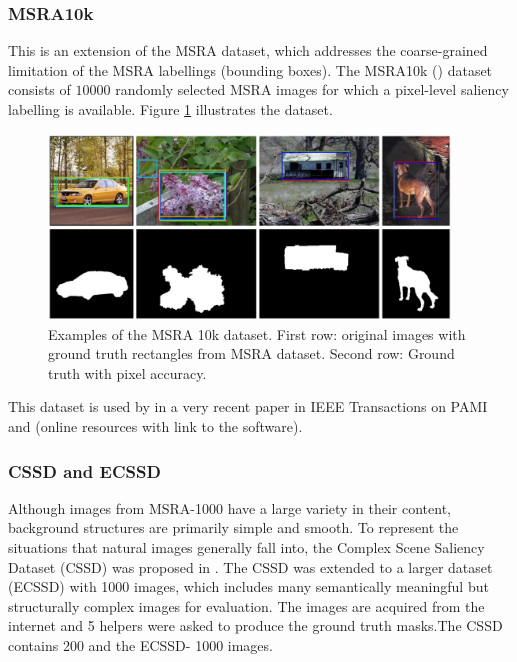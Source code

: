 \subsubsection{MSRA10k}
This is an extension of the MSRA dataset, which  addresses the coarse-grained limitation of the MSRA labellings (bounding boxes). The MSRA10k (\cite{msra10k_db}) dataset consists of $10000$ randomly selected MSRA images for which a pixel-level saliency labelling is available. Figure \ref{fig:msra10k} illustrates the dataset. 
\begin{figure}[H]
\begin{center}
\includegraphics[width=0.95\textwidth]{fig/MSRA10k}
\end{center}
\caption{Examples of the MSRA 10k dataset. First row: original images with ground truth rectangles from MSRA dataset. Second row: Ground truth with pixel accuracy.}
\label{fig:msra10k}
\end{figure}
This dataset is used by in a very recent paper in IEEE Transactions on PAMI \cite{ChengPAMI2015} and \cite{chengPAMIUrl} (online resources with link to the software). 

\subsubsection{CSSD and ECSSD}
Although images from MSRA-1000 \cite{} have a large variety in their content, background structures are primarily simple and smooth. To represent the situations that natural images generally fall into, the Complex Scene Saliency Dataset (CSSD) \cite{} was proposed in \cite{}. The CSSD was extended to a larger dataset (ECSSD) with 1000 images, which includes many semantically meaningful but structurally complex images for evaluation. The images are acquired from the internet and 5 helpers were asked to produce the ground truth masks.The CSSD contains 200 and the ECSSD- 1000 images.
